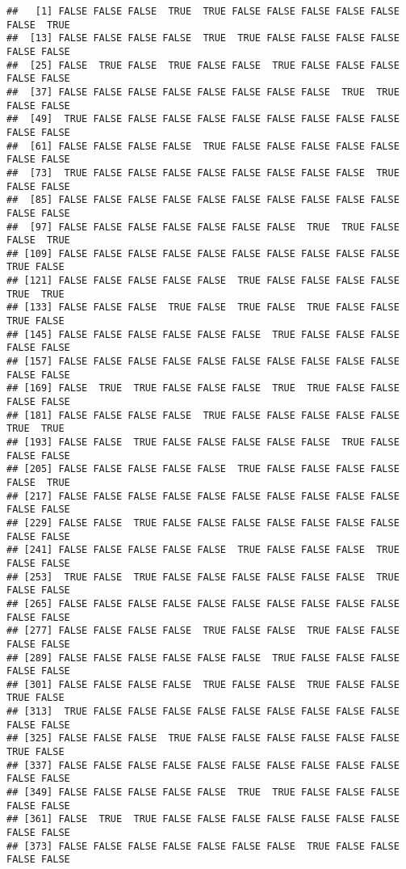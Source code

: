 \documentclass[
]{book}
\begin{document}
\begin{verbatim}
##   [1] FALSE FALSE FALSE  TRUE  TRUE FALSE FALSE FALSE FALSE FALSE FALSE  TRUE
##  [13] FALSE FALSE FALSE FALSE  TRUE  TRUE FALSE FALSE FALSE FALSE FALSE FALSE
##  [25] FALSE  TRUE FALSE  TRUE FALSE FALSE  TRUE FALSE FALSE FALSE FALSE FALSE
##  [37] FALSE FALSE FALSE FALSE FALSE FALSE FALSE FALSE  TRUE  TRUE FALSE FALSE
##  [49]  TRUE FALSE FALSE FALSE FALSE FALSE FALSE FALSE FALSE FALSE FALSE FALSE
##  [61] FALSE FALSE FALSE FALSE  TRUE FALSE FALSE FALSE FALSE FALSE FALSE FALSE
##  [73]  TRUE FALSE FALSE FALSE FALSE FALSE FALSE FALSE FALSE  TRUE FALSE FALSE
##  [85] FALSE FALSE FALSE FALSE FALSE FALSE FALSE FALSE FALSE FALSE FALSE FALSE
##  [97] FALSE FALSE FALSE FALSE FALSE FALSE FALSE  TRUE  TRUE FALSE FALSE  TRUE
## [109] FALSE FALSE FALSE FALSE FALSE FALSE FALSE FALSE FALSE FALSE  TRUE FALSE
## [121] FALSE FALSE FALSE FALSE FALSE  TRUE FALSE FALSE FALSE FALSE  TRUE  TRUE
## [133] FALSE FALSE FALSE  TRUE FALSE  TRUE FALSE  TRUE FALSE FALSE  TRUE FALSE
## [145] FALSE FALSE FALSE FALSE FALSE FALSE  TRUE FALSE FALSE FALSE FALSE FALSE
## [157] FALSE FALSE FALSE FALSE FALSE FALSE FALSE FALSE FALSE FALSE FALSE FALSE
## [169] FALSE  TRUE  TRUE FALSE FALSE FALSE  TRUE  TRUE FALSE FALSE FALSE FALSE
## [181] FALSE FALSE FALSE FALSE  TRUE FALSE FALSE FALSE FALSE FALSE  TRUE  TRUE
## [193] FALSE FALSE  TRUE FALSE FALSE FALSE FALSE FALSE  TRUE FALSE FALSE FALSE
## [205] FALSE FALSE FALSE FALSE FALSE  TRUE FALSE FALSE FALSE FALSE FALSE  TRUE
## [217] FALSE FALSE FALSE FALSE FALSE FALSE FALSE FALSE FALSE FALSE FALSE FALSE
## [229] FALSE FALSE  TRUE FALSE FALSE FALSE FALSE FALSE FALSE FALSE FALSE FALSE
## [241] FALSE FALSE FALSE FALSE FALSE  TRUE FALSE FALSE FALSE  TRUE FALSE FALSE
## [253]  TRUE FALSE  TRUE FALSE FALSE FALSE FALSE FALSE FALSE  TRUE FALSE FALSE
## [265] FALSE FALSE FALSE FALSE FALSE FALSE FALSE FALSE FALSE FALSE FALSE FALSE
## [277] FALSE FALSE FALSE FALSE  TRUE FALSE FALSE  TRUE FALSE FALSE FALSE FALSE
## [289] FALSE FALSE FALSE FALSE FALSE FALSE  TRUE FALSE FALSE FALSE FALSE FALSE
## [301] FALSE FALSE FALSE FALSE  TRUE FALSE FALSE  TRUE FALSE FALSE  TRUE FALSE
## [313]  TRUE FALSE FALSE FALSE FALSE FALSE FALSE FALSE FALSE FALSE FALSE FALSE
## [325] FALSE FALSE FALSE  TRUE FALSE FALSE FALSE FALSE FALSE FALSE  TRUE FALSE
## [337] FALSE FALSE FALSE FALSE FALSE FALSE FALSE FALSE FALSE FALSE FALSE FALSE
## [349] FALSE FALSE FALSE FALSE FALSE  TRUE  TRUE FALSE FALSE FALSE FALSE FALSE
## [361] FALSE  TRUE  TRUE FALSE FALSE FALSE FALSE FALSE FALSE FALSE FALSE FALSE
## [373] FALSE FALSE FALSE FALSE FALSE FALSE FALSE  TRUE FALSE FALSE FALSE FALSE

\end{verbatim}
\end{document}
